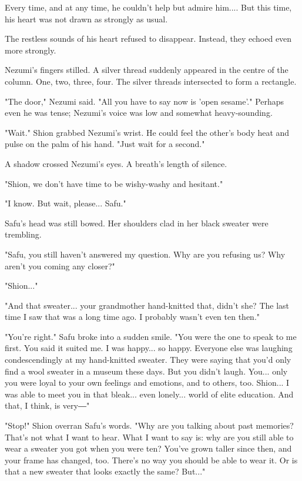Every time, and at any time, he couldn't help but admire him.... But
this time, his heart was not drawn as strongly as usual.

The restless sounds of his heart refused to disappear. Instead, they
echoed even more strongly.

Nezumi's fingers stilled. A silver thread suddenly appeared in the
centre of the column. One, two, three, four. The silver threads
intersected to form a rectangle.

"The door," Nezumi said. "All you have to say now is 'open sesame'."
Perhaps even he was tense; Nezumi's voice was low and somewhat
heavy-sounding.

"Wait." Shion grabbed Nezumi's wrist. He could feel the other's body
heat and pulse on the palm of his hand. "Just wait for a second."

A shadow crossed Nezumi's eyes. A breath's length of silence.

"Shion, we don't have time to be wishy-washy and hesitant."

"I know. But wait, please... Safu."

Safu's head was still bowed. Her shoulders clad in her black sweater
were trembling.

"Safu, you still haven't answered my question. Why are you refusing us?
Why aren't you coming any closer?"

"Shion..."

"And that sweater... your grandmother hand-knitted that, didn't she? The
last time I saw that was a long time ago. I probably wasn't even ten
then."

"You're right." Safu broke into a sudden smile. "You were the one to
speak to me first. You said it suited me. I was happy... so happy.
Everyone else was laughing condescendingly at my hand-knitted sweater.
They were saying that you'd only find a wool sweater in a museum these
days. But you didn't laugh. You... only you were loyal to your own
feelings and emotions, and to others, too. Shion... I was able to meet
you in that bleak... even lonely... world of elite education. And that,
I think, is very―"

"Stop!" Shion overran Safu's words. "Why are you talking about past
memories? That's not what I want to hear. What I want to say is: why are
you still able to wear a sweater you got when you were ten? You've grown
taller since then, and your frame has changed, too. There's no way you
should be able to wear it. Or is that a new sweater that looks exactly
the same? But..."

